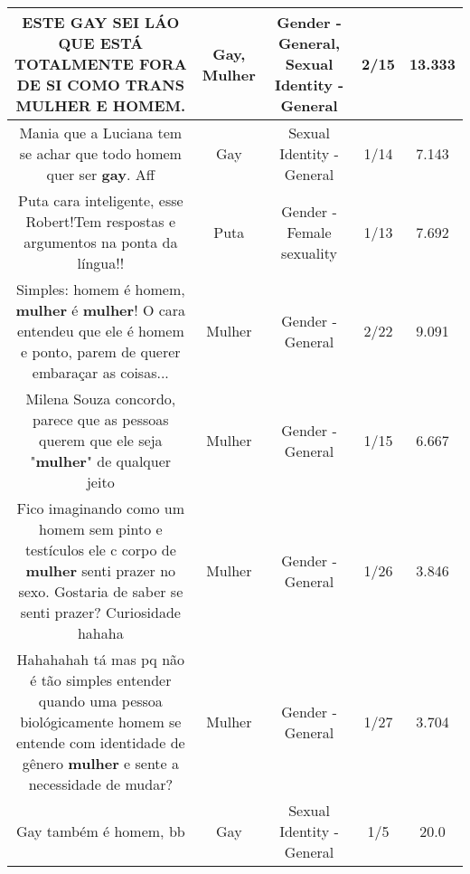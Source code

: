 \documentclass[11pt]{article}
\newlength\mylength
\begin{document}
\begin{center}
\begin{longtable}{|C{.65\mylength}|C{.30\mylength}|C{.12\mylength}|C{.12\mylength}|C{.12\mylength}|}
  \small ESTE \textbf{GAY} SEI LÁO QUE ESTÁ TOTALMENTE FORA DE SI COMO TRANS \textbf{MULHER} E HOMEM.\normalsize   & Gay, Mulher & Gender - General, Sexual Identity - General & 2/15 & 13.333 \\  \hline
  \small Mania que a Luciana tem se achar que todo homem quer ser \textbf{gay}. Aff\normalsize   & Gay & Sexual Identity - General & 1/14 & 7.143 \\  \hline
  \small Puta cara inteligente, esse Robert!Tem respostas e argumentos na ponta da língua!!\normalsize   & Puta & Gender - Female sexuality & 1/13 & 7.692 \\  \hline
  \small Simples: homem é homem, \textbf{mulher} é \textbf{mulher}! O cara entendeu que ele é homem e ponto, parem de querer embaraçar as coisas...\normalsize   & Mulher & Gender - General & 2/22 & 9.091 \\  \hline
  \small Milena Souza concordo, parece que as pessoas querem que ele seja "\textbf{mulher}" de qualquer jeito\normalsize   & Mulher & Gender - General & 1/15 & 6.667 \\  \hline
  \small Fico imaginando como um homem sem pinto e testículos ele c corpo de \textbf{mulher} senti prazer no sexo. Gostaria de saber se senti prazer? Curiosidade hahaha\normalsize   & Mulher & Gender - General & 1/26 & 3.846 \\  \hline
  \small Hahahahah tá mas pq não é tão simples entender quando uma pessoa biológicamente homem se entende com identidade de gênero \textbf{mulher} e sente a necessidade de mudar?\normalsize   & Mulher & Gender - General & 1/27 & 3.704 \\  \hline
  \small Gay também é homem, bb\normalsize   & Gay & Sexual Identity - General & 1/5 & 20.0 \\  \hline

\end{longtable}
\end{center}
\end{document}
